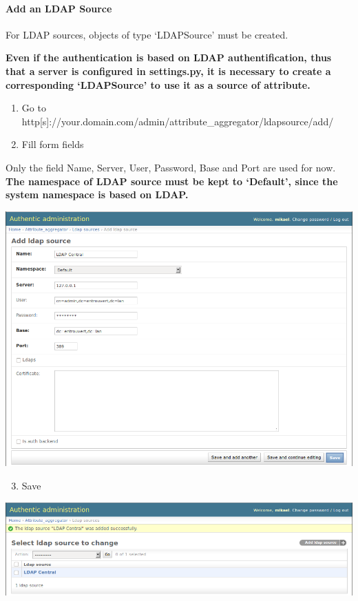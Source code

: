 \documentclass[letterpaper,10pt,english]{sphinxmanual}
\begin{document}
\paragraph{Add an LDAP Source}
\label{attribute_management:add-an-ldap-source}
For LDAP sources, objects of type `LDAPSource' must be created.

\textbf{Even if the authentication is based on LDAP authentification, thus that a
server is configured in settings.py, it is
necessary to create a corresponding `LDAPSource' to use it as a source of
attribute.}
\begin{enumerate}
\item {} 
Go to http{[}s{]}://your.domain.com/admin/attribute\_aggregator/ldapsource/add/

\item {} 
Fill form fields

\end{enumerate}

Only the field Name, Server, User, Password, Base and Port are used for now.
\textbf{The namespace of LDAP source must be kept to `Default', since the system
namespace is based on LDAP.}

\includegraphics{ldapsource.png}
\begin{enumerate}
\setcounter{enumi}{2}
\item {} 
Save

\end{enumerate}

\includegraphics{ldapsource_saved.png}
\end{document}
